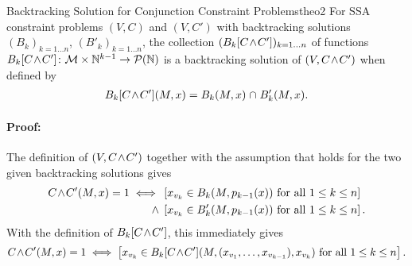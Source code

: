 \begin{theorem}{Backtracking Solution for Conjunction Constraint Problems}{theo2}
    For SSA constraint problems $(V,C)$ and $(V,C')$ with backtracking
    solutions $(B_k)_{k=1\dots n}$, $(B'_k)_{k=1\dots n}$, the collection
    $(B_k[C\hspace{-0.5mm}\land\hspace{-0.5mm}C'])_{k=1\dots n}$ of functions
    \mbox{$B_k[C\hspace{-0.5mm}\land\hspace{-0.5mm}C']\colon\mathcal M\times\mathbb N^{k-1}\rightarrow\mathcal P(\mathbb N)$}
    is a backtracking solution of
    $(V,C\hspace{-0.5mm}\land\hspace{-0.5mm}C')$ when defined by
    \begin{align*}
        B_k[C\hspace{-0.5mm}\land\hspace{-0.5mm}C'](M,x)=B_k(M,x)\mathrel\cap B'_k(M,x).
    \end{align*}
    \tcblower
    \paragraph*{Proof:}
    The definition of $(V,C\hspace{-0.5mm}\land\hspace{-0.5mm} C')$ together
    with the assumption that  holds for the two given
    backtracking solutions gives
    \begin{align*}
        C\hspace{-0.5mm}\land\hspace{-0.5mm}C'(M,x)=1\iff{}&\left[x_{v_k}\in B_k(M,p_{k-1}(x))\text{ for all }1\leq k\leq n\right]\\
                                            \mathrel\land{}&\left[x_{v_k}\in B'_k(M,p_{k-1}(x))\text{ for all }1\leq k\leq n\right].
    \end{align*}
    With the definition of $B_k[C\hspace{-0.5mm}\land\hspace{-0.5mm}C']$, this immediately gives
    \begin{align*}
        C\hspace{-0.5mm}\land\hspace{-0.5mm}C'(M,x)=1\iff\left[x_{v_k}\in B_k[C\hspace{-0.5mm}\land\hspace{-0.5mm}C'](M,(x_{v_1},\dots,x_{v_{k-1}}),x_{v_k})\text{ for all }1\leq k\leq n\right].
    \end{align*}
\end{theorem}
